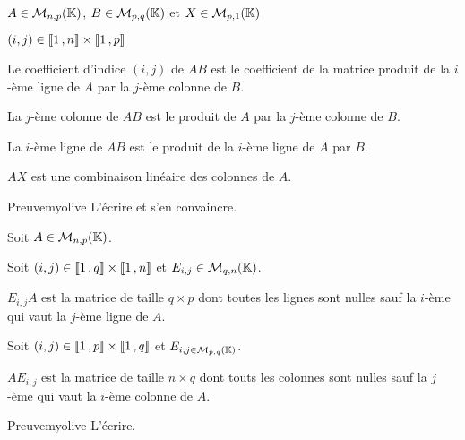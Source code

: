     \begin{prop}{}{}
        \begin{soient}
            \item $A \in \mathcal{M}_{n,p}(\mathbb{K})$, $B \in \mathcal{M}_{p,q}(\mathbb{K})$ et $X \in \mathcal{M}_{p,1}(\mathbb{K})$
            \item $(i,j) \in \left\llbracket 1 \, , n \right\rrbracket \times \left\llbracket 1 \, , p \right\rrbracket$
        \end{soient}

        \begin{alors}
            \item Le coefficient d’indice $(i,j)$ de $AB$ est le coefficient de la matrice produit de la $i$-ème ligne de $A$ par la $j$-ème colonne de $B$.
            \item La $j$-ème colonne de $AB$ est le produit de $A$ par la $j$-ème colonne de $B$.
            \item La $i$-ème ligne de $AB$ est le produit de la $i$-ème ligne de $A$ par $B$.
            \item $AX$ est une combinaison linéaire des colonnes de $A$.
        \end{alors}
    \end{prop}

    \begin{demo}{Preuve}{myolive}
        L’écrire et s’en convaincre.
    \end{demo}

    \begin{prop}{}{}
        Soit $A \in \mathcal{M}_{n,p}(\mathbb{K})$.

        \begin{alors}
            \item Soit $(i,j) \in \left\llbracket 1 \, , q \right\rrbracket \times \left\llbracket 1 \, , n \right\rrbracket$ et $E_{i,j} \in \mathcal{M}_{q,n}(\mathbb{K})$. 
            
            $E_{i,j} A$ est la matrice de taille $q \times p$ dont toutes les lignes sont nulles sauf la $i$-ème qui vaut la $j$-ème ligne de $A$.
            \item Soit $(i,j) \in \left\llbracket 1 \, , p \right\rrbracket \times \left\llbracket 1 \, , q \right\rrbracket$ et $E_{i,j \in \mathcal{M}_{p,q}(\mathbb{K})}$. 
            
            $A E_{i,j}$ est la matrice de taille $n \times q$ dont touts les colonnes sont nulles sauf la $j$-ème qui vaut la $i$-ème colonne de $A$.
        \end{alors}
    \end{prop}

    \begin{demo}{Preuve}{myolive}
        L’écrire.
    \end{demo}

